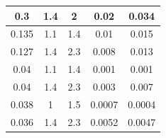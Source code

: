 \documentclass[12pt, a4paper]{article}
\begin{document}
\begin{table}[!h]
\begin{tabular}{|c|c|c|c|c|}
					0.3                                                                                
					&  1.4                                                                         
					&  2                                                                                          
					& 0.02                                                                                
					& 0.034  \\
					\hline
					\hline
					
					0.135                                                                              
					&  1.1                                                                         
					&  1.4                                                                                        
					& 0.01                                                                                
					& 0.015  \\
					\hline
					
					0.127                                                                              
					&  1.4                                                                         
					&  2.3                                                                                        
					& 0.008                                                                               
					& 0.013  \\
					\hline
					\hline
					
					0.04             
					&  1.1                                                                         
					&  1.4                                                                                        
					& 0.001                                                                               
					& 0.001  \\
					\hline
					
					0.04                                                                               
					&  1.4                                                                         
					&  2.3                                                                                        
					& 0.003                                                                               
					& 0.007  \\
					\hline
					\hline
					
					0.038          
					&  1
					&  1.5
					& 0.0007 
					& 0.0004 \\
					\hline
					
					0.036           
					&  1.4                                    
					&  2.3
					& 0.0052 
					& 0.0047    \\ 
					\hline
					
				\end{tabular}
				\label{table:vert_comp}
			\end{table}
\end{document}

